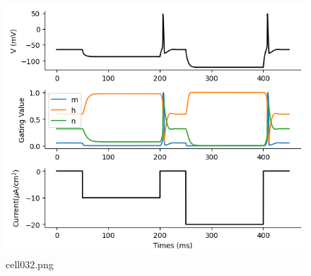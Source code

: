 \begin{figure}[ht]
	\centering
	\includegraphics[scale=0.8, max width=\linewidth]{./fig/neuron-model/hodgkin-huxley/cell032.png}
	\caption{cell032.png}
	\label{cell032.png}
\end{figure}